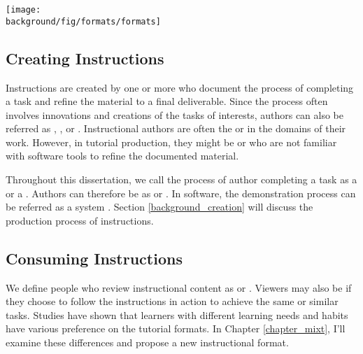 \begin{figure*}[th!]
  \centering
  \begin{minipage}{\textwidth}
  \texttt{[image: \\background/fig/formats/formats]}
  \caption[formats]{
    Major tutorial forms from online resources \footnote{Combine photos on the go, \url{https://helpx.adobe.com/mobile-apps/how-to/combine-photos-photoshop-mix.html}} \footnote{Change the color of an object, \url{https://helpx.adobe.com/photoshop/how-to/change-color-object-photoshop.html}}:
    a) Step-by-step static tutorials show a list of steps, each with text and figure(s) that describe a subtask, such as  or , and
    b) video tutorials show an author performing the task, which can be reviewed and controlled via a video player.
  }
  \label{fig:background_formats}
  \end{minipage}
\end{figure*}


\subsection{Creating Instructions}
Instructions are created by one or more  who document the process of completing a task and refine the material to a final deliverable.
%
Since the process often involves innovations and creations of the tasks of interests, authors can also be referred as , , or .
%
Instructional authors are often the  or  in the domains of their work. However, in tutorial production, they might be  or  who are not familiar with software tools to refine the documented material.

Throughout this dissertation, we call the process of author completing a task as a  or a . Authors can therefore be as  or .
%
In software, the demonstration process can be referred as a system . Section \ref{background_creation} will discuss the production process of instructions.


\subsection{Consuming Instructions}
We define people who review instructional content as  or . Viewers may also be  if they choose to follow the instructions in action to achieve the same or similar tasks.
%
Studies have shown that learners with different learning needs and habits have various preference on the tutorial formats. In Chapter \ref{chapter_mixt}, I'll examine these differences and propose a new instructional format.

